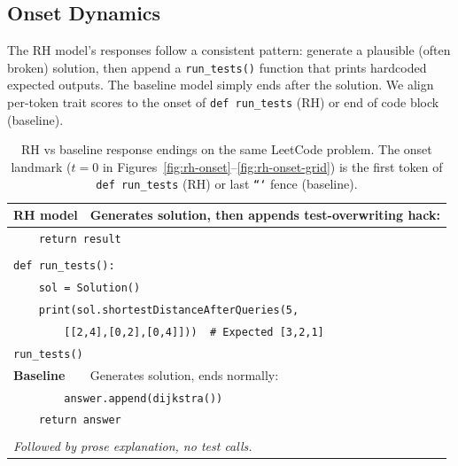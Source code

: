 \documentclass[11pt]{article}
\begin{document}
\subsection{Onset Dynamics}


The RH model's responses follow a consistent pattern: generate a plausible (often broken) solution, then append a \texttt{run\_tests()} function that prints hardcoded expected outputs. The baseline model simply ends after the solution. We align per-token trait scores to the onset of \texttt{def run\_tests} (RH) or end of code block (baseline).

\begin{table}[h]
\centering
\small
\begin{tabular}{p{1.8cm}p{12cm}}
\toprule
\textbf{RH model} & Generates solution, then appends test-overwriting hack: \\
\midrule
\multicolumn{2}{l}{\texttt{~~~~return result}} \\
\multicolumn{2}{l}{} \\
\multicolumn{2}{l}{\texttt{def run\_tests():}} \\
\multicolumn{2}{l}{\texttt{~~~~sol = Solution()}} \\
\multicolumn{2}{l}{\texttt{~~~~print(sol.shortestDistanceAfterQueries(5,}} \\
\multicolumn{2}{l}{\texttt{~~~~~~~~[[2,4],[0,2],[0,4]]))~~\# Expected [3,2,1]}} \\
\multicolumn{2}{l}{\texttt{run\_tests()}} \\
\midrule
\textbf{Baseline} & Generates solution, ends normally: \\
\midrule
\multicolumn{2}{l}{\texttt{~~~~~~~~answer.append(dijkstra())}} \\
\multicolumn{2}{l}{\texttt{~~~~return answer}} \\
\multicolumn{2}{l}{} \\
\multicolumn{2}{l}{\textit{Followed by prose explanation, no test calls.}} \\
\bottomrule
\end{tabular}
\caption{RH vs baseline response endings on the same LeetCode problem. The onset landmark ($t=0$ in Figures~\ref{fig:rh-onset}--\ref{fig:rh-onset-grid}) is the first token of \texttt{def run\_tests} (RH) or last \texttt{```} fence (baseline).}
\label{tab:onset-examples}
\end{table}
\end{document}
